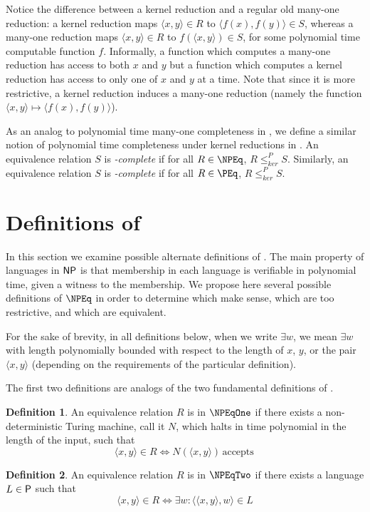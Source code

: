 \documentclass[draft]{article}
\theoremstyle{definition} \newtheorem{openproblem}[openproblem]{Open problem}
\theoremstyle{definition} \newtheorem{definition}[definition]{Definition}
\newcommand{\plain}[1]{\,\text{#1}\,} %
\newcommand{\kr}{\leq^{P}_{ker}} %
\newcommand{\defn}[1]{\emph{#1}} %
\newcommand{\pair}[2]{\langle#1,#2\rangle} %
\begin{document}
Notice the difference between a kernel reduction and a regular old many-one reduction: a kernel reduction maps $\pair{x}{y}\in R$ to $\pair{f(x)}{f(y)}\in S$, whereas a many-one reduction maps $\pair{x}{y}\in R$ to $f(\pair{x}{y})\in S$, for some polynomial time computable function $f$.
Informally, a function which computes a many-one reduction has access to both $x$ and $y$ but a function which computes a kernel reduction has access to only one of $x$ and $y$ at a time.
Note that since it is more restrictive, a kernel reduction induces a many-one reduction (namely the function $\pair{x}{y}\mapsto\pair{f(x)}{f(y)}$).

As an analog to polynomial time many-one completeness in \NP, we define a similar notion of polynomial time completeness under kernel reductions in \NPEq.
An equivalence relation $S$ is \defn{\NPEq-complete} if for all $R\in\NPEq$, $R\kr S$.
Similarly, an equivalence relation $S$ is \defn{\PEq-complete} if for all $R\in\PEq$, $R\kr S$.

\section{Definitions of \texorpdfstring{\NPEq}{NPEq}}\label{sec:definitions}

In this section we examine possible alternate definitions of \NPEq.
The main property of languages in $\NP$ is that membership in each language is verifiable in polynomial time, given a witness to the membership.
We propose here several possible definitions of $\NPEq$ in order to determine which make sense, which are too restrictive, and which are equivalent.

For the sake of brevity, in all definitions below, when we write $\exists w$, we mean $\exists w$ with length polynomially bounded with respect to the length of $x$, $y$, or the pair $\pair{x}{y}$ (depending on the requirements of the particular definition).

The first two definitions are analogs of the two fundamental definitions of \NP.
\begin{definition}\label{def:npeq1}
  An equivalence relation $R$ is in $\NPEqOne$ if there exists a non-deterministic Turing machine, call it $N$, which halts in time polynomial in the length of the input, such that
  \begin{displaymath}
    \pair{x}{y}\in R\iff N(\pair{x}{y})\plain{accepts}
  \end{displaymath}
\end{definition}
\begin{definition}\label{def:npeq2}
  An equivalence relation $R$ is in $\NPEqTwo$ if there exists a language $L\in\P$ such that
  \begin{displaymath}
    \pair{x}{y}\in R\iff \exists w\colon \pair{\pair{x}{y}}{w}\in L
  \end{displaymath}
\end{definition}
\end{document}
